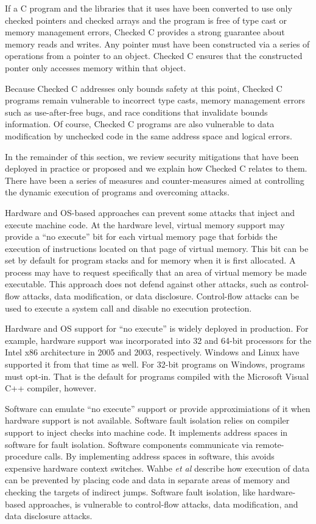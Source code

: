 If a C program and the libraries that it uses have been converted to use 
only checked pointers and checked arrays and the program is free of type 
cast or memory management errors, Checked C provides a strong
guarantee about memory reads and writes. Any pointer must have been constructed
via a  series of operations from a pointer to an object.   Checked C ensures 
that the constructed ponter only accesses memory within that object.  

Because Checked C addresses only bounds safety at this point, Checked C programs 
remain vulnerable  to incorrect type casts, memory management errors such as use-after-free bugs, and race conditions that invalidate bounds information.  Of course,
Checked C programs are also vulnerable to data modification by unchecked code
in the same address space and logical errors.

In the remainder of this section, we review security mitigations that
have been deployed in practice or proposed and we explain how Checked C
relates to them.  There have been a series of measures and counter-measures
aimed at controlling the dynamic execution of programs and overcoming
attacks.

Hardware and OS-based approaches can prevent some attacks that inject and
execute machine code.  At the hardware level, virtual memory support may provide
a ``no execute'' bit for each virtual memory page that forbids the execution
of instructions located on that page of virtual memory.  This bit can be set by
default for program stacks and for memory when it is first allocated. A process
may have to request specifically that an area of virtual memory be made
executable.  This approach does not defend against other attacks, such as
control-flow attacks,  data modification, or data disclosure.  
Control-flow attacks can be used to execute a system call and disable
no execution protection.    

Hardware and OS support for ``no execute'' is widely deployed in production.
For example, hardware support was incorporated into 32 and 64-bit processors
for the Intel x86 architecture in 2005 and 2003, respectively.  Windows
and Linux have supported it from that time as well.  For 32-bit programs on
Windows, programs must opt-in.  That is the default for programs compiled
with the Microsoft Visual C++ compiler, however.

Software can emulate ``no execute'' support or provide approximiations of it
when hardware support is not available. Software fault isolation
\cite{Castro2009, McCamant2006,Wahbe1993} relies on compiler support to inject
checks into machine code.
It implements address spaces in software  for fault isolation. Software components communicate via remote-procedure calls. By implementing address
spaces in software, this avoids expensive hardware context switches.
Wahbe {\it et al} \cite{Wahbe1993} describe how execution of data can be
prevented by placing code and data in separate areas of memory and checking the
targets of  indirect jumps.  Software fault isolation, like hardware-based
approaches,  is vulnerable to control-flow attacks, data modification, 
and data disclosure attacks.

